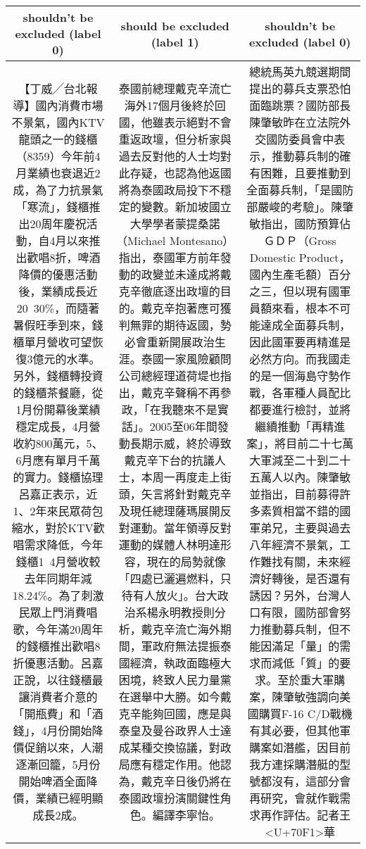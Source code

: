 {\begin{tabularx}{\textwidth}{|C|C|C|}
\textbf{shouldn't be excluded (label 0)} & 
\textbf{should be excluded (label 1)} &
\textbf{shouldn't be excluded (label 0)}\\
\hline
【丁威╱台北報導】國內消費市場不景氣，國內KTV龍頭之一的錢櫃（8359）今年前4月業績也衰退近2成，為了力抗景氣「寒流」，錢櫃推出20周年慶祝活動，自4月以來推出歡唱8折，啤酒降價的優惠活動後，業績成長近20~30\%，而隨著暑假旺季到來，錢櫃單月營收可望恢復3億元的水準。另外，錢櫃轉投資的錢櫃茶餐廳，從1月份開幕後業績穩定成長，4月營收約800萬元，5、6月應有單月千萬的實力。錢櫃協理呂嘉正表示，近1、2年來民眾荷包縮水，對於KTV歡唱需求降低，今年錢櫃1~4月營收較去年同期年減18.24\%。為了刺激民眾上門消費唱歌，今年滿20周年的錢櫃推出歡唱8折優惠活動。呂嘉正說，以往錢櫃最讓消費者介意的「開瓶費」和「酒錢」，4月份開始降價促銷以來，人潮逐漸回籠，5月份開始啤酒全面降價，業績已經明顯成長2成。
&
泰國前總理戴克辛流亡海外17個月後終於回國，他雖表示絕對不會重返政壇，但分析家與過去反對他的人士均對此存疑，也認為他返國將為泰國政局投下不穩定的變數。新加坡國立大學學者蒙提桑諾（Michael Montesano）指出，泰國軍方前年發動的政變並未達成將戴克辛徹底逐出政壇的目的。戴克辛抱著應可獲判無罪的期待返國，勢必會重新開展政治生涯。泰國一家風險顧問公司總經理道荷堤也指出，戴克辛聲稱不再參政，「在我聽來不是實話」。2005至06年間發動長期示威，終於導致戴克辛下台的抗議人士，本周一再度走上街頭，矢言將針對戴克辛及現任總理薩瑪展開反對運動。當年領導反對運動的媒體人林明達形容，現在的局勢就像「四處已灑遍燃料，只待有人放火」。台大政治系楊永明教授則分析，戴克辛流亡海外期間，軍政府無法提振泰國經濟，執政面臨極大困境，終致人民力量黨在選舉中大勝。如今戴克辛能夠回國，應是與泰皇及曼谷政界人士達成某種交換協議，對政局應有穩定作用。他認為，戴克辛日後仍將在泰國政壇扮演關鍵性角色。編譯李寧怡。
&
總統馬英九競選期間提出的募兵支票恐怕面臨跳票？國防部長陳肇敏昨在立法院外交國防委員會中表示，推動募兵制的確有困難，且要推動到全面募兵制，「是國防部嚴峻的考驗」。陳肇敏指出，國防預算佔ＧＤＰ（Gross Domestic Product，國內生產毛額）百分之三，但以現有國軍員額來看，根本不可能達成全面募兵制，因此國軍要再精進是必然方向。而我國走的是一個海島守勢作戰，各軍種人員配比都要進行檢討，並將繼續推動「再精進案」，將目前二十七萬大軍減至二十到二十五萬人以內。陳肇敏並指出，目前募得許多素質相當不錯的國軍弟兄，主要與過去八年經濟不景氣，工作難找有關，未來經濟好轉後，是否還有誘因？另外，台灣人口有限，國防部會努力推動募兵制，但不能因滿足「量」的需求而減低「質」的要求。至於重大軍購案，陳肇敏強調向美國購買F-16 C/D戰機有其必要，但其他軍購案如潛艦，因目前我方連採購潛艇的型號都沒有，這部分會再研究，會就作戰需求再作評估。記者王<U+70F1>華
\\
\hline

\end{tabularx}
}




